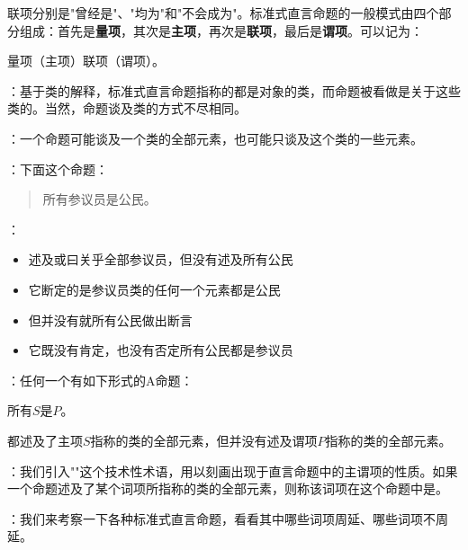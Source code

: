 联项分别是"曾经是"、"均为"和"不会成为"。标准式直言命题的一般模式由四个部分组成：首先是\textbf{量项}，其次是\textbf{主项}，再次是\textbf{联项}，最后是\textbf{谓项}。可以记为：

量项（主项）联项（谓项）。

\begin{theorembox}[title=周延性的基本概念]
：基于类的解释，标准式直言命题指称的都是对象的类，而命题被看做是关于这些类的。当然，命题谈及类的方式不尽相同。

：一个命题可能谈及一个类的全部元素，也可能只谈及这个类的一些元素。

：下面这个命题：

\begin{quote}
所有参议员是公民。
\end{quote}

：
\begin{itemize}
  \item 述及或曰关乎全部参议员，但没有述及所有公民
  \item 它断定的是参议员类的任何一个元素都是公民
  \item 但并没有就所有公民做出断言
  \item 它既没有肯定，也没有否定所有公民都是参议员
\end{itemize}

：任何一个有如下形式的A命题：

\begin{center}
所有$S$是$P$。
\end{center}

都述及了主项$S$指称的类的全部元素，但并没有述及谓项$P$指称的类的全部元素。

：我们引入""这个技术性术语，用以刻画出现于直言命题中的主谓项的性质。如果一个命题述及了某个词项所指称的类的全部元素，则称该词项在这个命题中是。

：我们来考察一下各种标准式直言命题，看看其中哪些词项周延、哪些词项不周延。
\end{theorembox}

